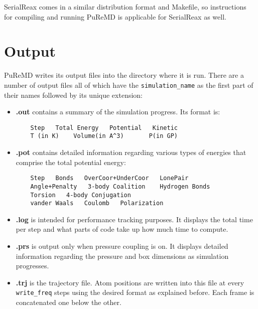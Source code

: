 \documentclass{article}
\begin{document}
{SerialReax comes in a similar distribution format and Makefile,
so instructions for compiling and running PuReMD is applicable for 
SerialReax as well.


\section{Output}
\label{sec:puremd_output}

PuReMD writes its output files into the directory where it is run. 
There are a number of output files all of which have the 
{\tt simulation\_name} as the first part of their names followed 
by its unique extension:

\begin{itemize}
  \item{\textbf{.out}} contains a summary of the simulation progress. 
    Its format is:
    \begin{verbatim}
    Step   Total Energy   Potential   Kinetic   
    T (in K)    Volume(in A^3)       P(in GP)
  \end{verbatim}

\item{\textbf{.pot}} contains detailed information regarding various types of
  energies that comprise the total potential energy:
    \begin{verbatim}
    Step   Bonds   OverCoor+UnderCoor   LonePair   
    Angle+Penalty   3-body Coalition    Hydrogen Bonds  
    Torsion   4-body Conjugation   
    vander Waals   Coulomb   Polarization
  \end{verbatim}

\item{\textbf{.log}} is intended for performance tracking purposes. 
  It displays the total time per step and what parts of code take 
    up how much time to compute.

  \item{\textbf{.prs}} is output only when pressure coupling is on. 
    It displays detailed information regarding the pressure and 
    box dimensions as simulation progresses.

  \item{\textbf{.trj}} is the trajectory file. Atom positions are written 
    into this file at every {\tt write\_freq} steps using the desired format 
    as explained before. Each frame is concatenated one below the other.

\end{itemize}

}
\end{document}

